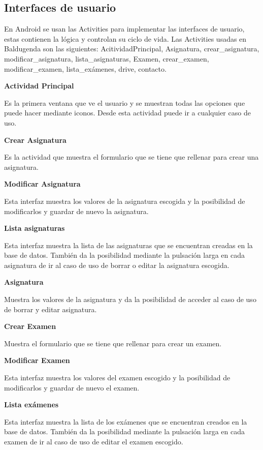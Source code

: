 \subsection{Interfaces de usuario}
\label{subsecc:Interfaces de usuario}

En Android se usan las Activities para implementar las interfaces de usuario, estas contienen la lógica y controlan su ciclo de vida.
Las Activities usadas en Baldugenda son las siguientes: AcitividadPrincipal, Asignatura, crear\_asignatura, modificar\_asignatura, lista\_asignaturas, Examen, crear\_examen, modificar\_examen, lista\_exámenes, drive, contacto.

\textbf{Actividad Principal}

Es la primera ventana que ve el usuario y se muestran todas las opciones que puede hacer mediante iconos.
Desde esta actividad puede ir a cualquier  caso de uso.

\textbf{Crear Asignatura}

Es la actividad que muestra el formulario que se tiene que rellenar para crear una asignatura.

\textbf{Modificar Asignatura}

Esta interfaz muestra los valores de la asignatura escogida y la posibilidad de modificarlos y guardar de nuevo la asignatura.

\textbf{Lista asignaturas}

Esta interfaz muestra la lista de las asignaturas que se encuentran creadas en la base de datos.
También da la posibilidad mediante la pulsación larga en cada asignatura de ir al caso de uso de borrar o editar la asignatura escogida.

\textbf{Asignatura}

Muestra los valores de la asignatura y da la posibilidad de acceder al caso de uso de borrar y editar asignatura.

\textbf{Crear Examen}

Muestra el formulario que se tiene que rellenar para crear un examen.

\textbf{Modificar Examen}

Esta interfaz muestra los valores del examen escogido y la posibilidad de modificarlos y guardar de nuevo el examen.

\textbf{Lista exámenes}

Esta interfaz muestra la lista de los exámenes que se encuentran creados en la base de datos.
También da la posibilidad mediante la pulsación larga en cada examen de ir al caso de uso de editar el examen escogido.

